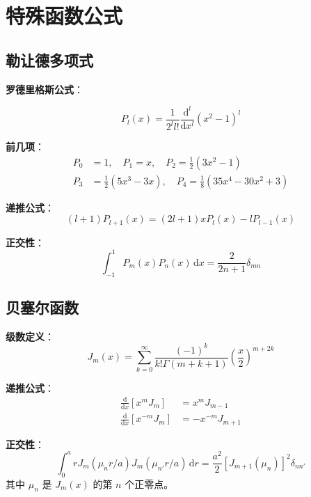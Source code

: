 
\chapter{特殊函数公式}

\section{勒让德多项式}

\textbf{罗德里格斯公式}：
\begin{zhongyao}[勒让德多项式罗德里格斯公式]
\[
    P_l(x) = \frac{1}{2^l l!}\frac{\mathrm{d}^l}{\mathrm{d}x^l}(x^2-1)^l
\]
\end{zhongyao}

\textbf{前几项}：
\begin{align}
    P_0 &= 1, \quad P_1 = x, \quad P_2 = \frac{1}{2}(3x^2-1) \\
    P_3 &= \frac{1}{2}(5x^3-3x), \quad P_4 = \frac{1}{8}(35x^4-30x^2+3)
\end{align}

\textbf{递推公式}：
\begin{equation}
    (l+1)P_{l+1}(x) = (2l+1)xP_l(x) - lP_{l-1}(x)
\end{equation}

\textbf{正交性}：
\begin{equation}
    \int_{-1}^{1} P_m(x)P_n(x)\,\mathrm{d}x = \frac{2}{2n+1}\delta_{mn}
\end{equation}

\section{贝塞尔函数}

\textbf{级数定义}：
\begin{equation}
    J_m(x) = \sum_{k=0}^{\infty} \frac{(-1)^k}{k!\Gamma(m+k+1)}\left(\frac{x}{2}\right)^{m+2k}
\end{equation}

\textbf{递推公式}：
\begin{align}
    \frac{\mathrm{d}}{\mathrm{d}x}[x^m J_m] &= x^m J_{m-1} \\
    \frac{\mathrm{d}}{\mathrm{d}x}[x^{-m} J_m] &= -x^{-m} J_{m+1}
\end{align}

\textbf{正交性}：
\begin{equation}
    \int_0^a rJ_m(\mu_n r/a)J_m(\mu_{n'} r/a)\,\mathrm{d}r = \frac{a^2}{2}[J_{m+1}(\mu_n)]^2\delta_{nn'}
\end{equation}
其中 $\mu_n$ 是 $J_m(x)$ 的第 $n$ 个正零点。

